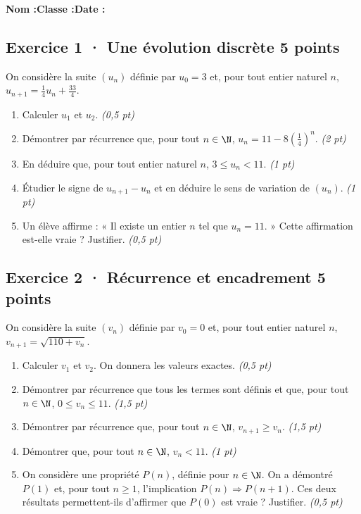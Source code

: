 \smallskip\textbf{Nom :}\enspace\dotfill\quad\textbf{Classe :}\enspace\dotfill\quad\textbf{Date :}\enspace\dotfill

\subsection*{Exercice 1 · Une évolution discrète \hfill 5 points}On considère la suite $(u_n)$ définie par $u_0=3$ et, pour tout entier naturel $n$, $u_{n+1}=\frac{1}{4}u_n+\frac{33}{4}$.

\begin{enumerate}

\item Calculer $u_1$ et $u_2$. \hfill\textit{(0,5 pt)}

\item Démontrer par récurrence que, pour tout $n\in\N$, $u_n=11-8\left(\frac{1}{4}\right)^n$. \hfill\textit{(2 pt)}

\item En déduire que, pour tout entier naturel $n$, $3\le u_n<11$. \hfill\textit{(1 pt)}

\item Étudier le signe de $u_{n+1}-u_n$ et en déduire le sens de variation de $(u_n)$. \hfill\textit{(1 pt)}

\item Un élève affirme : « Il existe un entier $n$ tel que $u_n=11$. » Cette affirmation est-elle vraie ? Justifier. \hfill\textit{(0,5 pt)}

\end{enumerate}

\subsection*{Exercice 2 · Récurrence et encadrement \hfill 5 points}On considère la suite $(v_n)$ définie par $v_0=0$ et, pour tout entier naturel $n$, $v_{n+1}=\sqrt{110+v_n}$.

\begin{enumerate}

\item Calculer $v_1$ et $v_2$. On donnera les valeurs exactes. \hfill\textit{(0,5 pt)}

\item Démontrer par récurrence que tous les termes sont définis et que, pour tout $n\in\N$, $0\le v_n\le11$. \hfill\textit{(1,5 pt)}

\item Démontrer par récurrence que, pour tout $n\in\N$, $v_{n+1}\ge v_n$. \hfill\textit{(1,5 pt)}

\item Démontrer que, pour tout $n\in\N$, $v_n<11$. \hfill\textit{(1 pt)}

\item On considère une propriété $P(n)$, définie pour $n\in\N$. On a démontré $P(1)$ et, pour tout $n\ge1$, l'implication $P(n)\Rightarrow P(n+1)$. Ces deux résultats permettent-ils d'affirmer que $P(0)$ est vraie ? Justifier. \hfill\textit{(0,5 pt)}

\end{enumerate}

